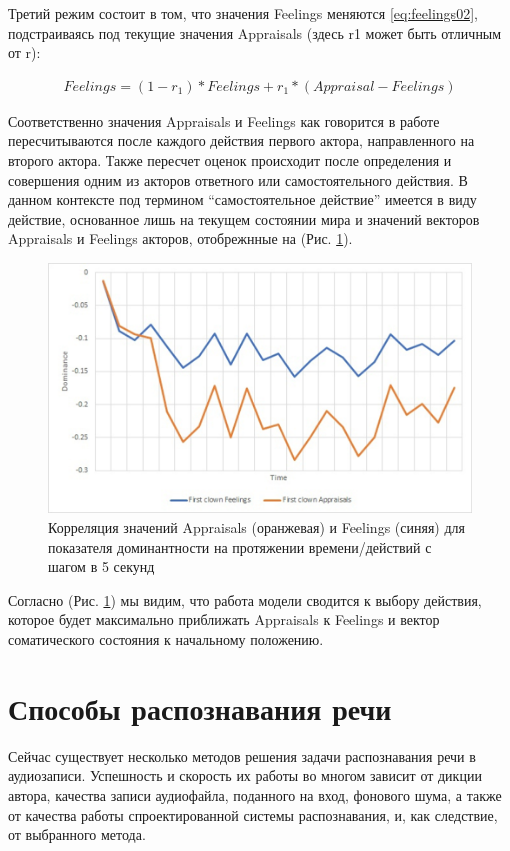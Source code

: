 Третий режим состоит в том, что значения Feelings меняются \ref{eq:feelings02}, подстраиваясь под текущие значения Appraisals (здесь r1 может быть отличным от r): 

\begin{equation}
  \begin{gathered}
    Feelings=(1-r_1 )*Feelings+r_1*(Appraisal-Feelings)
  \end{gathered}
  \label{eq:feelings02}
\end{equation}

Соответственно значения Appraisals и Feelings как говорится в работе \cite{Samsonovich05} пересчитываются после каждого действия первого актора, направленного на второго актора.
Также пересчет оценок происходит после определения и совершения одним из акторов ответного или самостоятельного действия. 
В данном контексте под термином “самостоятельное действие” имеется в виду действие, основанное лишь на текущем состоянии мира и 
значений векторов Appraisals и Feelings акторов, отобрежнные на (Рис. \ref{pic:ris8}). 


\begin{figure}[h]
\includegraphics[width=0.75\columnwidth]{./img/ris8.png}
\centering
\caption{Корреляция значений Appraisals (оранжевая) и Feelings (синяя) для показателя доминантности на протяжении времени/действий с шагом в 5 секунд}
\label{pic:ris8}
\end{figure}

Согласно (Рис. \ref{pic:ris8}) мы видим, что работа модели сводится к выбору действия, 
которое будет максимально приближать Appraisals к Feelings и вектор соматического состояния к начальному положению.

\section{Способы распознавания речи}
Сейчас существует несколько методов решения задачи распознавания речи в аудиозаписи. Успешность и скорость их работы во многом зависит от дикции автора, качества записи аудиофайла, поданного на вход, фонового шума, а также от качества работы спроектированной системы распознавания, и, как следствие, от выбранного метода.

